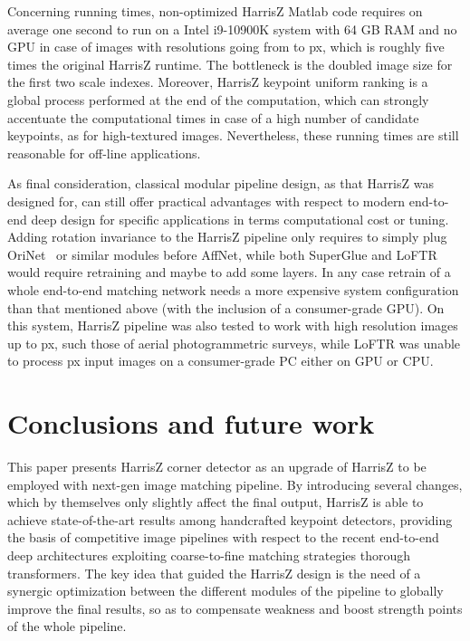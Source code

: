 \documentclass[times,twocolumn,final,authoryear]{elsarticle}
\begin{document}
Concerning running times, non-optimized HarrisZ Matlab code requires on average one second to run on a Intel i9-10900K system with 64 GB RAM and no GPU in case of images with resolutions going from  to  px, which is roughly five times the original HarrisZ runtime. The bottleneck is the doubled image size for the first two scale indexes. Moreover, HarrisZ keypoint uniform ranking is a global process performed at the end of the computation, which can strongly accentuate the computational times in case of a high number of candidate keypoints, as for high-textured images. Nevertheless, these running times are still reasonable for off-line applications.     

As final consideration, classical modular pipeline design, as that HarrisZ was designed for, can still offer practical advantages with respect to modern end-to-end deep design for specific applications in terms computational cost or tuning. Adding rotation invariance to the HarrisZ pipeline only requires to simply plug OriNet~\citep{affnet} or similar modules before AffNet, while both SuperGlue and LoFTR would require retraining and maybe to add some layers. In any case retrain of a whole end-to-end matching network needs a more expensive system configuration than that mentioned above (with the inclusion of a consumer-grade GPU). On this system, HarrisZ pipeline was also tested to work with high resolution images up to  px, such those of aerial photogrammetric surveys, while LoFTR was unable to process  px input images on a consumer-grade PC either on GPU or CPU.

\vspace{-1.25em}
\section{Conclusions and future work}\label{conclusions}
\vspace{-0.75em}
This paper presents HarrisZ corner detector as an upgrade of HarrisZ to be employed with next-gen image matching pipeline. By introducing several changes, which by themselves only slightly affect the final output, HarrisZ is able to achieve state-of-the-art results among handcrafted keypoint detectors, providing the basis of competitive image pipelines with respect to the recent end-to-end deep architectures exploiting coarse-to-fine matching strategies thorough transformers. The key idea that guided the HarrisZ design is the need of a synergic optimization between the different modules of the pipeline to globally improve the final results, so as to compensate weakness and boost strength points of the whole pipeline.
\end{document}
